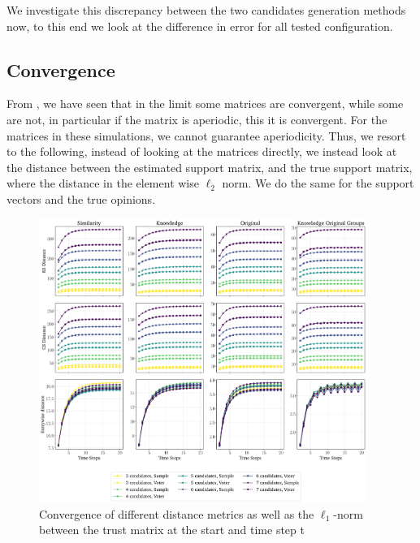 We investigate this discrepancy between the two candidates generation methods
now, to this end we look at the difference in error for all tested
configuration.


\subsection{Convergence}

From , we have seen that in the limit some matrices are
convergent, while some are not, in particular if the matrix is aperiodic, this
it is convergent. For the matrices in these simulations, we cannot guarantee
aperiodicity. Thus, we resort to the following, instead of looking at the
matrices directly, we instead look at the distance between the estimated
support matrix, and the true support matrix, where the distance in the element
wise $\ell_2$ norm. We do the same for the support vectors and the true
opinions.

\begin{figure}
	\begin{center}
		\includegraphics[width=0.95\textwidth]{Figures/convergence_groups.pdf}
	\end{center}
	\caption{Convergence of different distance metrics as well as the
		$\ell_1$-norm between the trust matrix at the start and time step
		t}\label{fig:convergence_big}
\end{figure}




